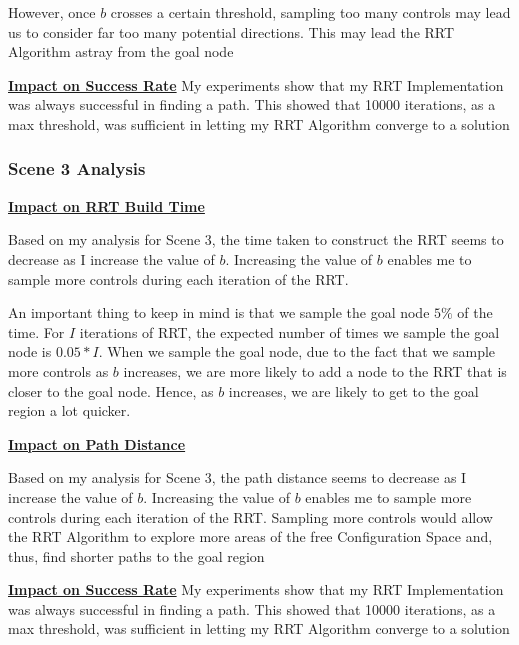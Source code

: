 \documentclass{article}
\begin{document}
However, once $b$ crosses a certain threshold, sampling too many controls may lead us to consider far too many potential directions. This may lead the RRT Algorithm astray from the goal node \newline 

\textbf{\underline{Impact on Success Rate}} \newline
My experiments show that my RRT Implementation was always successful in finding a path. This showed that 10000 iterations, as a max threshold, was sufficient in letting my RRT Algorithm converge to a solution

\subsubsection{Scene 3 Analysis}
\textbf{\underline{Impact on RRT Build Time}} \newline

Based on my analysis for Scene 3, the time taken to construct the RRT seems to decrease as I increase the value of $b$. Increasing the value of $b$ enables me to sample more controls during each iteration of the RRT. \newline 

An important thing to keep in mind is that we sample the goal node $5\%$ of the time. For $I$ iterations of RRT, the expected number of times we sample the goal node is $0.05 * I$. When we sample the goal node, due to the fact that we sample more controls as $b$ increases, we are more likely to add a node to the RRT that is closer to the goal node. Hence, as $b$ increases, we are likely to get to the goal region a lot quicker. \newline 


\textbf{\underline{Impact on Path Distance}} \newline

Based on my analysis for Scene 3, the path distance seems to decrease as I increase the value of $b$. Increasing the value of $b$ enables me to sample more controls during each iteration of the RRT. Sampling more controls would allow the RRT Algorithm to explore more areas of the free Configuration Space and, thus, find shorter paths to the goal region \newline 

\textbf{\underline{Impact on Success Rate}} \newline
My experiments show that my RRT Implementation was always successful in finding a path. This showed that 10000 iterations, as a max threshold, was sufficient in letting my RRT Algorithm converge to a solution
\end{document}
